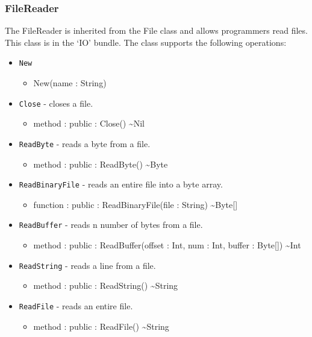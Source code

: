 \documentclass[12pt]{article}
\begin{document}
\subsubsection{FileReader}
The FileReader is inherited from the File class and allows programmers
read files.  This class is in the `IO' bundle.  The class supports the
following operations:
\begin{itemize}
\item \texttt{New}
  \begin{itemize}
  \item New(name : String)
  \end{itemize}
\item \texttt{Close} - closes a file.
  \begin{itemize}
  \item method : public : Close() \textasciitilde Nil
  \end{itemize}
\item \texttt{ReadByte} - reads a byte from a file.
  \begin{itemize}
  \item method : public : ReadByte() \textasciitilde Byte
  \end{itemize}
\item \texttt{ReadBinaryFile} - reads an entire file into a byte array.
  \begin{itemize}
  \item function : public : ReadBinaryFile(file : String) \textasciitilde Byte[]
  \end{itemize}
\item \texttt{ReadBuffer} - reads n number of bytes from a file.
  \begin{itemize}
  \item method : public : ReadBuffer(offset : Int, num : Int, buffer :
    Byte[]) \textasciitilde Int
  \end{itemize}
\item \texttt{ReadString} - reads a line from a file.
  \begin{itemize}
  \item method : public : ReadString() \textasciitilde String
  \end{itemize}
\item \texttt{ReadFile} - reads an entire file.
  \begin{itemize}
  \item method : public : ReadFile() \textasciitilde String
  \end{itemize}
\end{itemize}
\end{document}
